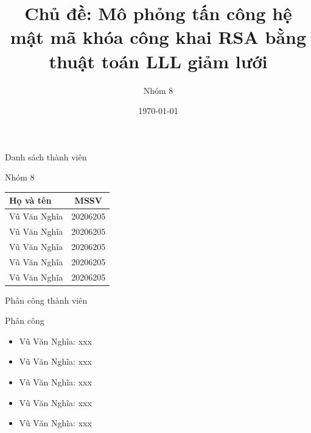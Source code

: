 \documentclass{beamer}
\title[{\makebox[.15\paperwidth]{MI4100 - Mật mã và độ phức tạp thuật toán}}]{Chủ đề: Mô phỏng tấn công hệ mật mã khóa công khai RSA bằng thuật toán LLL giảm lưới}
\author[Nhóm 8]{Nhóm 8}
\date[\today]{\today}
\begin{document}
\begin{frame}
\titlepage
\end{frame}
\begin{frame}{Danh sách thành viên}
\begin{block}{Nhóm 8}
\centering
\begin{tabular} {|l|c|}
\hline
Họ và tên & MSSV \\
\hline
Vũ Văn Nghĩa & 20206205 \\
Vũ Văn Nghĩa & 20206205 \\
Vũ Văn Nghĩa & 20206205 \\
Vũ Văn Nghĩa & 20206205 \\
Vũ Văn Nghĩa & 20206205 \\
\hline
\end{tabular}
\end{block}
\end{frame}
\begin{frame}{Phân công thành viên}
\begin{block}{Phân công}
\begin{itemize}
\item Vũ Văn Nghĩa: xxx
\item Vũ Văn Nghĩa: xxx
\item Vũ Văn Nghĩa: xxx
\item Vũ Văn Nghĩa: xxx
\item Vũ Văn Nghĩa: xxx
\end{itemize}
\end{block}
\end{frame}
\end{document}
